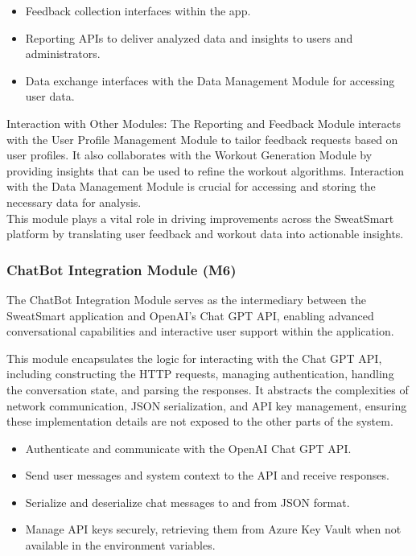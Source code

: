 \documentclass[12pt, titlepage]{article}
\begin{document}
\begin{description}[leftmargin=0pt]
\item[Interfaces:]
\end{description}
\begin{itemize}[leftmargin=*]
\item Feedback collection interfaces within the app.
\item Reporting APIs to deliver analyzed data and insights to users and administrators.
\item Data exchange interfaces with the Data Management Module for accessing user data.
\end{itemize}

Interaction with Other Modules: The Reporting and Feedback Module interacts with the User Profile Management Module to tailor feedback requests based on user profiles. It also collaborates with the Workout Generation Module by providing insights that can be used to refine the workout algorithms. Interaction with the Data Management Module is crucial for accessing and storing the necessary data for analysis.
\\

This module plays a vital role in driving improvements across the SweatSmart platform by translating user feedback and workout data into actionable insights.

\subsubsection{ChatBot Integration Module (M6)}

The ChatBot Integration Module serves as the intermediary between the SweatSmart application and OpenAI's Chat GPT API, enabling advanced conversational capabilities and interactive user support within the application.

\begin{description}[leftmargin=0pt]
\item[Secrets:] 
This module encapsulates the logic for interacting with the Chat GPT API, including constructing the HTTP requests, managing authentication, handling the conversation state, and parsing the responses. It abstracts the complexities of network communication, JSON serialization, and API key management, ensuring these implementation details are not exposed to the other parts of the system.
\end{description}

\begin{description}[leftmargin=0pt]
\item[Services:]
\end{description}
\begin{itemize}[leftmargin=*]
\item Authenticate and communicate with the OpenAI Chat GPT API.
\item Send user messages and system context to the API and receive responses.
\item Serialize and deserialize chat messages to and from JSON format.
\item Manage API keys securely, retrieving them from Azure Key Vault when not available in the environment variables.
\end{itemize}
\end{document}
